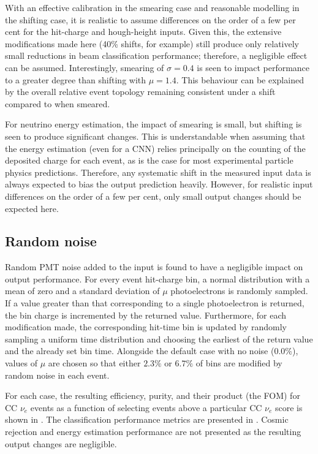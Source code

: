 With an effective calibration in the smearing case and reasonable modelling in the shifting case,
it is realistic to assume differences on the order of a few per cent for the hit-charge and
hough-height inputs. Given this, the extensive modifications made here (40\% shifts, for example)
still produce only relatively small reductions in beam classification performance; therefore, a
negligible effect can be assumed. Interestingly, smearing of $\sigma=0.4$ is seen to impact
performance to a greater degree than shifting with $\mu=1.4$. This behaviour can be explained by
the overall relative event topology remaining consistent under a shift compared to when smeared.

For neutrino energy estimation, the impact of smearing is small, but shifting is seen to produce
significant changes. This is understandable when assuming that the energy estimation (even for a
CNN) relies principally on the counting of the deposited charge for each event, as is the case for
most experimental particle physics predictions. Therefore, any systematic shift in the measured
input data is always expected to bias the output prediction heavily. However, for realistic input
differences on the order of a few per cent, only small output changes should be expected here.

\subsection{Random noise} %
\label{sec:results_robust_noise} %

Random PMT noise added to the input is found to have a negligible impact on output performance.
For every event hit-charge bin, a normal distribution with a mean of zero and a standard deviation
of $\mu$ photoelectrons is randomly sampled. If a value greater than that corresponding to a
single photoelectron is returned, the bin charge is incremented by the returned value.
Furthermore, for each modification made, the corresponding hit-time bin is updated by randomly
sampling a uniform time distribution and choosing the earliest of the return value and the already
set bin time. Alongside the default case with no noise ($0.0\%$), values of $\mu$ are chosen so
that either $2.3\%$ or $6.7\%$ of bins are modified by random noise in each event.

For each case, the resulting efficiency, purity, and their product (the FOM) for CC $\nu_{e}$
events as a function of selecting events above a particular CC $\nu_{e}$ score is shown in
. The classification performance metrics are presented
in . Cosmic rejection and energy estimation performance are not
presented as the resulting output changes are negligible.


